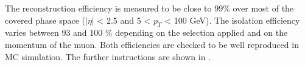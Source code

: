 The reconstruction efficiency is measured to be close to 99\% over most of the covered phase space ($|\eta|$ < 2.5 and 5 < $p_{T}$ < 100 GeV). The isolation efficiency varies between 93 and 100 \% depending on the selection applied and on the momentum of the muon. Both efficiencies are checked to be well reproduced in MC simulation. 
The further instructions are shown in \cite{MUON-2018-03}.
\begin{table}[ht]
 \label{tab:muon_selection}
 \caption{Summary of muon selection used in this analysis}
\end{table}

